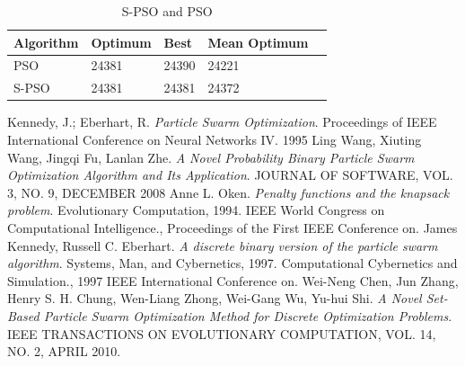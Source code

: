 \documentclass{article}
\begin{document}
\begin{table}
\begin{tabular}{|l|l|l|l|l|}
	\hline
	Algorithm & Optimum & Best & Mean Optimum\\ \hline
	PSO & 24381 & 24390 & 24221\\ \hline
	S-PSO & 24381 & 24381 & 24372\\ \hline
\end{tabular}
\caption{S-PSO and PSO}
\end{table}

\newpage

\begin{thebibliography}{99}
		Kennedy, J.; Eberhart, R.
		\emph{Particle Swarm Optimization}.
		Proceedings of IEEE International Conference on Neural Networks IV.
		1995
		Ling Wang, Xiuting Wang, Jingqi Fu, Lanlan Zhe.
	  	\emph{A Novel Probability Binary Particle Swarm Optimization Algorithm and Its Application}.
	  	JOURNAL OF SOFTWARE, VOL. 3, NO. 9, DECEMBER 2008
		Anne L. Oken.
		\emph{Penalty functions and the knapsack problem}.
		Evolutionary Computation, 1994. IEEE World Congress on Computational Intelligence., Proceedings of the First IEEE Conference on.
		James Kennedy, Russell C. Eberhart.
		\emph{A discrete binary version of the particle swarm algorithm}.
		Systems, Man, and Cybernetics, 1997. Computational Cybernetics and Simulation., 1997 IEEE International Conference on.
		Wei-Neng Chen, Jun Zhang, Henry S. H. Chung, Wen-Liang Zhong, Wei-Gang Wu, Yu-hui Shi.
		\emph{A Novel Set-Based Particle Swarm Optimization Method for Discrete Optimization Problems}.
		IEEE TRANSACTIONS ON EVOLUTIONARY COMPUTATION, VOL. 14, NO. 2, APRIL 2010.
\end{thebibliography}
\end{document}
